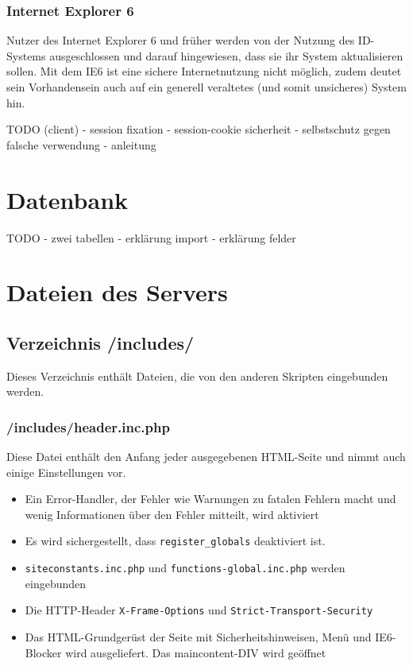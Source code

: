 \documentclass[parskip=half]{scrartcl}
\begin{document}
\subsubsection{Internet Explorer 6}
Nutzer des Internet Explorer 6 und früher werden von der Nutzung des ID-Systems ausgeschlossen und darauf hingewiesen, dass sie ihr System aktualisieren sollen.
Mit dem IE6 ist eine sichere Internetnutzung nicht möglich, zudem deutet sein Vorhandensein auch auf ein generell veraltetes (und somit unsicheres) System hin.



TODO (client)
- session fixation
- session-cookie sicherheit
- selbstschutz gegen falsche verwendung
- anleitung

\section{Datenbank}
TODO
- zwei tabellen
- erklärung import
- erklärung felder

\section{Dateien des Servers}

\subsection{Verzeichnis /includes/}
Dieses Verzeichnis enthält Dateien, die von den anderen Skripten eingebunden werden.

\subsubsection{/includes/header.inc.php}
Diese Datei enthält den Anfang jeder ausgegebenen HTML-Seite und nimmt auch einige Einstellungen vor.
\begin{itemize}
	\item Ein Error-Handler, der Fehler wie Warnungen zu fatalen Fehlern macht und wenig Informationen über den Fehler mitteilt, wird aktiviert
	\item Es wird sichergestellt, dass \texttt{register\_globals} deaktiviert ist.
	\item \texttt{siteconstants.inc.php} und \texttt{functions-global.inc.php} werden eingebunden
	\item Die HTTP-Header \texttt{X-Frame-Options} und \texttt{Strict-Transport-Security}
	\item Das HTML-Grundgerüst der Seite mit Sicherheitshinweisen, Menü und IE6-Blocker wird ausgeliefert. Das maincontent-DIV wird geöffnet
\end{itemize}
\end{document}
